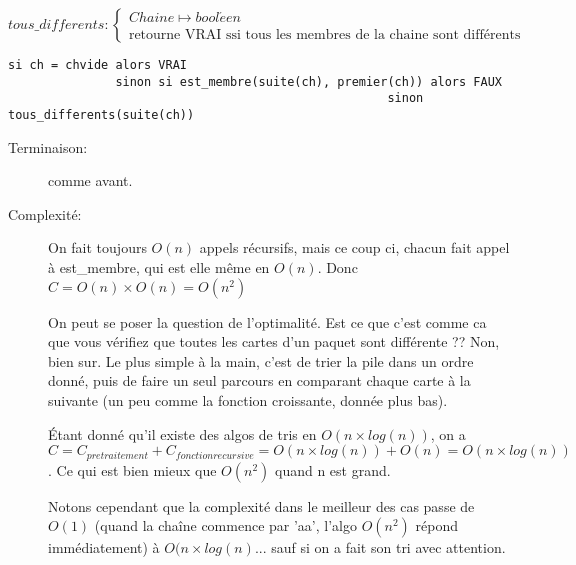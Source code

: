 \documentclass[10pt]{article}\usepackage[correction,nu]{esial}
\begin{document}
\begin{Question}
  $tous\_differents: \left\{
    \begin{array}{l}
      Chaine\mapsto bool\acute{e}en\\
      \text{retourne VRAI ssi tous les membres de la chaine sont différents}
    \end{array}\right.$  
\end{Question}
\begin{Reponse}
  \begin{Verbatim}[label=tous\_differents(ch)]
si ch = chvide alors VRAI
               sinon si est_membre(suite(ch), premier(ch)) alors FAUX
                                                     sinon tous_differents(suite(ch))    
  \end{Verbatim}
  \begin{description}
  \item[Terminaison:] comme avant.
  \item[Complexité:] On fait toujours $O(n)$ appels récursifs, mais ce coup ci,
    chacun fait appel à est\_membre, qui est elle même en $O(n)$. Donc $C =
    O(n)\times O(n) = O(n^2)$

    On peut se poser la question de l'optimalité. Est ce que c'est comme ca que
    vous vérifiez que toutes les cartes d'un paquet sont différente ?? Non,
    bien sur. Le plus simple à la main, c'est de trier la pile dans un ordre
    donné, puis de faire un seul parcours en comparant chaque carte à la
    suivante (un peu comme la fonction croissante, donnée plus bas).

    Étant donné qu'il existe des algos de tris en $O(n\times log(n))$, on a
    $$C = C_{pretraitement}+C_{fonction recursive}= O(n\times log(n)) + O(n) =
    O(n\times log(n))$$. Ce qui est bien mieux que $O(n^2)$ quand n est grand.

    Notons cependant que la complexité dans le meilleur des cas passe de $O(1)$
    (quand la chaîne commence par 'aa', l'algo $O(n^2)$ répond immédiatement) à
    $O(n\times log(n)$... sauf si on a fait son tri avec attention.
  \end{description}
\end{Reponse}
\end{document}
